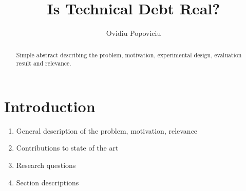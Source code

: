 \documentclass{mpaper}
\begin{document}
\title{Is Technical Debt Real?}
\author{Ovidiu Popoviciu}


\maketitle


\begin{abstract}
Simple abstract describing the problem, motivation, experimental design,
evaluation result and relevance.
\end{abstract}

\section{Introduction}
\label{introduction}

\begin{enumerate}
  \item General description of the problem, motivation, relevance
  \item Contributions to state of the art 
  \item Research questions
  \item Section descriptions
\end{enumerate}


\end{document}
